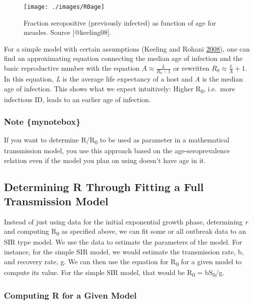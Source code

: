 \documentclass[
]{book}
\begin{document}
\begin{figure}
\texttt{[image: ./images/R0age]} \caption{Fraction seropositive (previously infected) as function of age for measles. Source [@keeling08].}\label{fig:R0age}
\end{figure}

For a simple model with certain assumptions (Keeling and Rohani \protect\hyperlink{ref-keeling08}{2008}), one can find an approximating equation connecting the median age of infection and the basic reproductive number with the equation \(A \approx \frac {L}{R_0 - 1}\) or rewritten \(R_0 \approx \frac{L}{A} + 1\). In this equation, \emph{L} is the average life expectancy of a host and \emph{A} is the median age of infection. This shows what we expect intuitively: Higher R\textsubscript{0}, i.e.~more infectious ID, leads to an earlier age of infection.

\hypertarget{note-mynotebox}{%
\subsubsection{Note \{mynotebox\}}\label{note-mynotebox}}

If you want to determine R/R\textsubscript{0} to be used as parameter in a mathematical transmission model, you use this approach based on the age-seroprevalence relation even if the model you plan on using doesn't have age in it.

\hypertarget{determining-r-through-fitting-a-full-transmission-model}{%
\subsection{Determining R Through Fitting a Full Transmission Model}\label{determining-r-through-fitting-a-full-transmission-model}}

Instead of just using data for the initial exponential growth phase, determining \emph{r} and computing R\textsubscript{0} as specified above, we can fit some or all outbreak data to an SIR type model. We use the data to estimate the parameters of the model. For instance, for the simple SIR model, we would estimate the transmission rate, b, and recovery rate, g. We can then use the equation for R\textsubscript{0} for a given model to compute its value. For the simple SIR model, that would be R\textsubscript{0} = bS\textsubscript{0}/g.

\hypertarget{myadvancedbox}{%
\subsubsection{Computing R for a Given Model}\label{myadvancedbox}}
\end{document}
